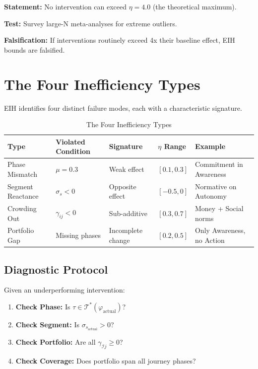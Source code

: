 \begin{tcolorbox}[colback=green!5!white, colframe=green!75!black,
    title=Prediction EIH-P4: Efficiency Ceiling]
\textbf{Statement:} No intervention can exceed $\eta = 4.0$ (the theoretical maximum).

\textbf{Test:} Survey large-N meta-analyses for extreme outliers.

\textbf{Falsification:} If interventions routinely exceed 4x their baseline
effect, EIH bounds are falsified.
\end{tcolorbox}


\section{The Four Inefficiency Types}
\label{sec:eih-inefficiency-types}

EIH identifies four distinct failure modes, each with a characteristic signature.

\begin{table}[htbp]
\centering
\caption{The Four Inefficiency Types}
\label{tab:inefficiency-types}
\renewcommand{\arraystretch}{1.4}
\begin{tabular}{@{}lllll@{}}
\toprule
\textbf{Type} & \textbf{Violated Condition} & \textbf{Signature} & \textbf{$\eta$ Range} & \textbf{Example} \\
\midrule
Phase Mismatch & $\mu = 0.3$ & Weak effect & $[0.1, 0.3]$ & Commitment in Awareness \\
Segment Reactance & $\sigma_s < 0$ & Opposite effect & $[-0.5, 0]$ & Normative on Autonomy \\
Crowding Out & $\gamma_{ij} < 0$ & Sub-additive & $[0.3, 0.7]$ & Money + Social norms \\
Portfolio Gap & Missing phases & Incomplete change & $[0.2, 0.5]$ & Only Awareness, no Action \\
\bottomrule
\end{tabular}
\end{table}

\subsection{Diagnostic Protocol}

Given an underperforming intervention:
\begin{enumerate}
\item \textbf{Check Phase:} Is $\tau \in \mathcal{T}^*(\varphi_{\text{actual}})$?
\item \textbf{Check Segment:} Is $\sigma_{s_{\text{actual}}} > 0$?
\item \textbf{Check Portfolio:} Are all $\gamma_{\mathcal{I}j} \geq 0$?
\item \textbf{Check Coverage:} Does portfolio span all journey phases?
\end{enumerate}

